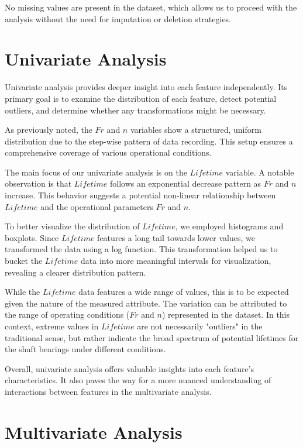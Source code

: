 No missing values are present in the dataset, which allows us to proceed with the analysis without the need for imputation or deletion strategies.


\section{Univariate Analysis}

Univariate analysis provides deeper insight into each feature independently. Its primary goal is to examine the distribution of each feature, detect potential outliers, and determine whether any transformations might be necessary.

As previously noted, the $Fr$ and $n$ variables show a structured, uniform distribution due to the step-wise pattern of data recording. This setup ensures a comprehensive coverage of various operational conditions.

The main focus of our univariate analysis is on the $Lifetime$ variable. A notable observation is that $Lifetime$ follows an exponential decrease pattern as $Fr$ and $n$ increase. This behavior suggests a potential non-linear relationship between $Lifetime$ and the operational parameters $Fr$ and $n$.

To better visualize the distribution of $Lifetime$, we employed histograms and boxplots. Since $Lifetime$ features a long tail towards lower values, we transformed the data using a log function. This transformation helped us to bucket the $Lifetime$ data into more meaningful intervals for visualization, revealing a clearer distribution pattern.

While the $Lifetime$ data features a wide range of values, this is to be expected given the nature of the measured attribute. The variation can be attributed to the range of operating conditions ($Fr$ and $n$) represented in the dataset. In this context, extreme values in $Lifetime$ are not necessarily "outliers" in the traditional sense, but rather indicate the broad spectrum of potential lifetimes for the shaft bearings under different conditions.

Overall, univariate analysis offers valuable insights into each feature's characteristics. It also paves the way for a more nuanced understanding of interactions between features in the multivariate analysis.


\section{Multivariate Analysis}

